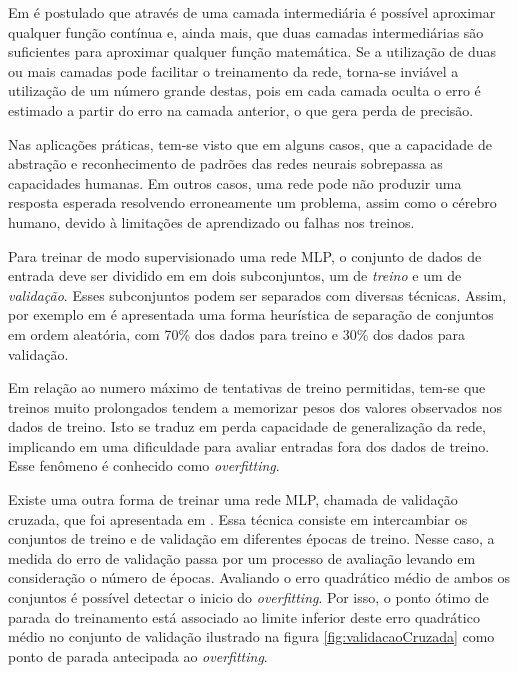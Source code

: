             Em  é postulado que através de uma camada intermediária é possível aproximar qualquer função contínua e, ainda mais, que duas camadas intermediárias são suficientes para aproximar qualquer função matemática. Se a utilização de duas ou mais camadas pode facilitar o treinamento da rede, torna-se inviável a utilização de um número grande destas, pois em cada camada oculta o erro é estimado a partir do erro na camada anterior, o que gera perda de precisão.
            
            Nas aplicações práticas, tem-se visto que em alguns casos, que a capacidade de abstração e reconhecimento de padrões das redes neurais sobrepassa as capacidades humanas. Em outros casos, uma rede pode não produzir uma resposta esperada resolvendo erroneamente um problema, assim como o cérebro humano, devido à limitações de aprendizado ou falhas nos treinos. 
              
            Para treinar de modo supervisionado uma rede MLP, o conjunto de dados de entrada deve ser dividido em em dois subconjuntos, um de \textit{treino} e um de \textit{validação}. Esses subconjuntos podem ser separados com diversas técnicas. Assim, por exemplo em  é apresentada uma forma heurística de separação de conjuntos em ordem aleatória, com 70\% dos dados para treino e 30\% dos dados para validação.
            
            Em relação ao numero máximo de tentativas de treino permitidas, tem-se que treinos muito prolongados tendem a memorizar pesos dos valores observados nos dados de treino. Isto se traduz em perda capacidade de generalização da rede, implicando em uma dificuldade para avaliar entradas fora dos dados de treino. Esse fenômeno é conhecido como \textit{overfitting}.
            
            Existe uma outra forma de treinar uma rede MLP, chamada de validação cruzada, que foi apresentada em \cite{crossvalidation}. Essa técnica consiste em intercambiar os conjuntos de treino e de validação em diferentes épocas de treino. Nesse caso, a medida do erro de validação passa por um processo de avaliação levando em consideração o número de épocas. Avaliando o erro quadrático médio de ambos os conjuntos é possível detectar o inicio do \textit{overfitting}. Por isso, o ponto ótimo de parada do treinamento está associado ao limite inferior deste erro quadrático médio no conjunto de validação ilustrado na figura \ref{fig:validacaoCruzada} como ponto de parada antecipada ao \textit{overfitting}.
            
